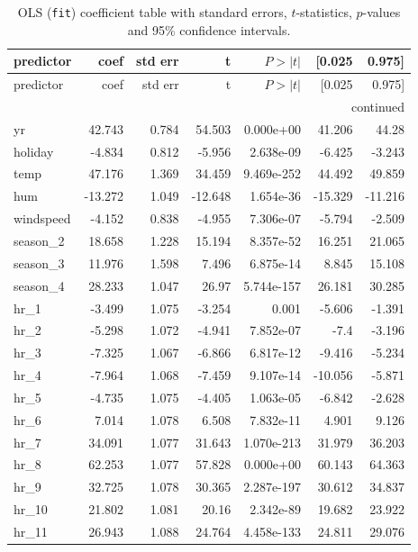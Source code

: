 \begin{longtable}{lrrrrrr}
\caption{OLS (\texttt{fit}) coefficient table with standard errors, $t$-statistics, $p$-values and 95\% confidence intervals.}\label{tab:ols-coefs}\\
\toprule
predictor & coef & std err & t & $P>|t|$ & [0.025 & 0.975] \\
\midrule
\endfirsthead
\toprule
predictor & coef & std err & t & $P>|t|$ & [0.025 & 0.975] \\
\midrule
\endhead
\midrule \multicolumn{7}{r}{\footnotesize continued} \\
\endfoot
\bottomrule
\endlastfoot
yr & 42.743 & 0.784 & 54.503 & 0.000e+00 & 41.206 & 44.28 \\
holiday & -4.834 & 0.812 & -5.956 & 2.638e-09 & -6.425 & -3.243 \\
temp & 47.176 & 1.369 & 34.459 & 9.469e-252 & 44.492 & 49.859 \\
hum & -13.272 & 1.049 & -12.648 & 1.654e-36 & -15.329 & -11.216 \\
windspeed & -4.152 & 0.838 & -4.955 & 7.306e-07 & -5.794 & -2.509 \\
season\_2 & 18.658 & 1.228 & 15.194 & 8.357e-52 & 16.251 & 21.065 \\
season\_3 & 11.976 & 1.598 & 7.496 & 6.875e-14 & 8.845 & 15.108 \\
season\_4 & 28.233 & 1.047 & 26.97 & 5.744e-157 & 26.181 & 30.285 \\
hr\_1 & -3.499 & 1.075 & -3.254 & 0.001 & -5.606 & -1.391 \\
hr\_2 & -5.298 & 1.072 & -4.941 & 7.852e-07 & -7.4 & -3.196 \\
hr\_3 & -7.325 & 1.067 & -6.866 & 6.817e-12 & -9.416 & -5.234 \\
hr\_4 & -7.964 & 1.068 & -7.459 & 9.107e-14 & -10.056 & -5.871 \\
hr\_5 & -4.735 & 1.075 & -4.405 & 1.063e-05 & -6.842 & -2.628 \\
hr\_6 & 7.014 & 1.078 & 6.508 & 7.832e-11 & 4.901 & 9.126 \\
hr\_7 & 34.091 & 1.077 & 31.643 & 1.070e-213 & 31.979 & 36.203 \\
hr\_8 & 62.253 & 1.077 & 57.828 & 0.000e+00 & 60.143 & 64.363 \\
hr\_9 & 32.725 & 1.078 & 30.365 & 2.287e-197 & 30.612 & 34.837 \\
hr\_10 & 21.802 & 1.081 & 20.16 & 2.342e-89 & 19.682 & 23.922 \\
hr\_11 & 26.943 & 1.088 & 24.764 & 4.458e-133 & 24.811 & 29.076 \\

\end{longtable}

